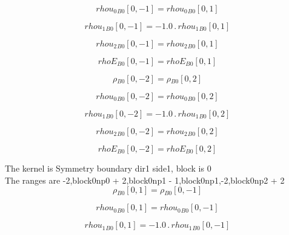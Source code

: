 \documentclass{article}
\begin{document}
\begin{dmath}{rhou_{0}{_{B0}}}[{0,-1}] = {rhou_{0}{_{B0}}}[{0,1}]\end{dmath}

\begin{dmath}{rhou_{1}{_{B0}}}[{0,-1}] = - 1.0 \,.\, {rhou_{1}{_{B0}}}[{0,1}]\end{dmath}

\begin{dmath}{rhou_{2}{_{B0}}}[{0,-1}] = {rhou_{2}{_{B0}}}[{0,1}]\end{dmath}

\begin{dmath}{rhoE{_{B0}}}[{0,-1}] = {rhoE{_{B0}}}[{0,1}]\end{dmath}

\begin{dmath}{\rho{_{B0}}}[{0,-2}] = {\rho{_{B0}}}[{0,2}]\end{dmath}

\begin{dmath}{rhou_{0}{_{B0}}}[{0,-2}] = {rhou_{0}{_{B0}}}[{0,2}]\end{dmath}

\begin{dmath}{rhou_{1}{_{B0}}}[{0,-2}] = - 1.0 \,.\, {rhou_{1}{_{B0}}}[{0,2}]\end{dmath}

\begin{dmath}{rhou_{2}{_{B0}}}[{0,-2}] = {rhou_{2}{_{B0}}}[{0,2}]\end{dmath}

\begin{dmath}{rhoE{_{B0}}}[{0,-2}] = {rhoE{_{B0}}}[{0,2}]\end{dmath}

\noindent The kernel is Symmetry boundary dir1 side1, block is 0\\\noindent The ranges are -2,block0np0 + 2,block0np1 - 1,block0np1,-2,block0np2 + 2\\\begin{dmath}{\rho{_{B0}}}[{0,1}] = {\rho{_{B0}}}[{0,-1}]\end{dmath}

\begin{dmath}{rhou_{0}{_{B0}}}[{0,1}] = {rhou_{0}{_{B0}}}[{0,-1}]\end{dmath}

\begin{dmath}{rhou_{1}{_{B0}}}[{0,1}] = - 1.0 \,.\, {rhou_{1}{_{B0}}}[{0,-1}]\end{dmath}
\end{document}
